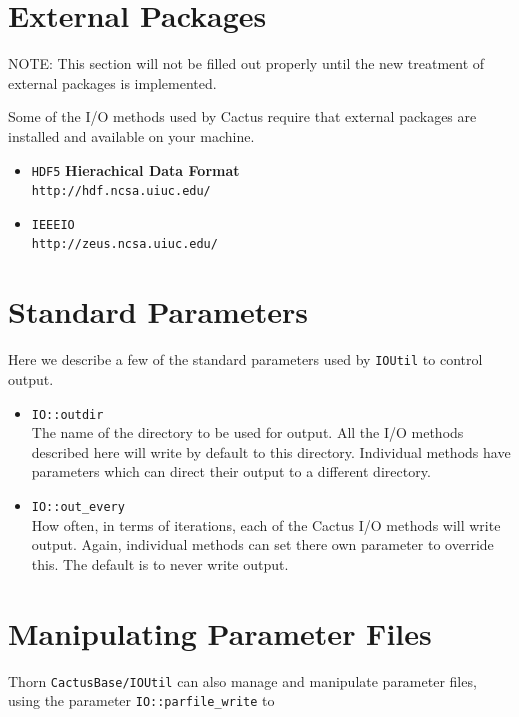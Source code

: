 \documentclass{article}
\begin{document}
\section{External Packages}

NOTE: This section will not be filled out properly until the new treatment of external 
packages is implemented.

Some of the I/O methods used by Cactus require that external packages are installed and available 
on your machine. 

\begin{itemize}

\item{\tt HDF5} {\bf Hierachical Data Format}\\
{\tt http://hdf.ncsa.uiuc.edu/}

\item{\tt IEEEIO} \\
{\tt http://zeus.ncsa.uiuc.edu/}

\end{itemize}

\section{Standard Parameters}

Here we describe a few of the standard parameters used by {\tt IOUtil}
to control output. 
\begin{itemize}

\item{\tt IO::outdir}\\
  The name of the directory to be used for output. All the I/O 
  methods described here will write by default to this directory. 
  Individual methods have parameters
which can direct their output to a different directory.

\item{\tt IO::out\_every}\\
  How often, in terms of iterations, each of the Cactus I/O methods will
  write output. Again, individual methods can set there own parameter 
  to override this. The default is to never write output.
\end{itemize}

\section{Manipulating Parameter Files}

Thorn {\tt CactusBase/IOUtil} can also manage and manipulate parameter 
files, using the parameter {\tt IO::parfile\_write} to 
\end{document}
